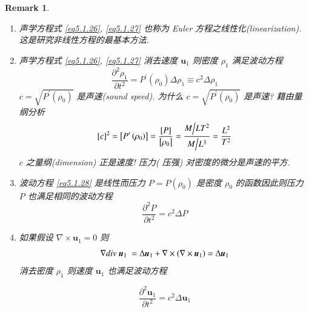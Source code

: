 \documentclass[11pt]{article}
\newtheorem{remark}{Remark}[subsection]
\begin{document}
\begin{remark}
	
	\text{}
	
	\vspace{-0.75cm}
	
	\begin{enumerate}
		\item 声学方程式 \ref{eq5.1.26}, \ref{eq5.1.27} 也称为 Euler 方程之线性化(linearization). 这是研究非线性方程的最基本方法.
		\item 声学方程式 \ref{eq5.1.26}, \ref{eq5.1.27} 消去速度 $ \boldsymbol{u}_{1} $ 则密度 $ \rho_1 $ 满足波动方程
		\begin{equation}
		\frac{{{\partial ^2}{\rho _1}}}{{\partial {t^2}}} = {P^{\prime}}\left( {{\rho _0}} \right)\Delta {\rho _1} \equiv {c^2}\Delta {\rho _1}
		\label{eq5.1.28}
		\end{equation}
		$c = \sqrt {{P^{\prime}}\left( {{\rho _0}} \right)} $ 是声速(sound speed). 为什么 $c = \sqrt {{P^{\prime}}\left( {{\rho _0}} \right)} $  是声速? 籍由量纲分析
		\begin{equation}
		{\left[ c \right]^2} = \left[ {{P^{\prime}}\left( {{\rho _0}} \right)} \right] = \frac{{\left[ P \right]}}{{\left[ {{\rho _0}} \right]}} = \frac{{{M \mathord{\left/
						{\vphantom {M {L{T^2}}}} \right.
						\kern-\nulldelimiterspace} {L{T^2}}}}}{{{M \mathord{\left/
						{\vphantom {M {{L^3}}}} \right.
						\kern-\nulldelimiterspace} {{L^3}}}}} = \frac{{{L^2}}}{{{T^2}}}
		\notag
		\end{equation}
		$ c $ 之量纲(dimension) 正是速度! 压力({\color{red} 压强}) 对密度的微分是声速的平方. 
		\item 波动方程 \ref{eq5.1.28} 是线性而压力 $P = P\left( {{\rho _0}} \right)$ 是密度 $ \rho_0 $ 的函数因此则压力 $ P $ 也满足相同的波动方程
		\begin{equation}
		\frac{{{\partial ^2}P}}{{\partial {t^2}}} = {c^2}\Delta P
		\label{eq5.1.29}
		\end{equation}
		\item 如果假设 $\nabla  \times {\boldsymbol{u}_1} = 0$ 则
		\begin{equation}
		\nabla div\;{\boldsymbol{u}_1}\; = \Delta {\boldsymbol{u}_1} + \nabla  \times \left( {\nabla  \times {\boldsymbol{u}_1}} \right) = \Delta {\boldsymbol{u}_1}
		\notag 
		\end{equation}
		消去密度 $ \rho_1 $ 则速度 $ \boldsymbol{u}_{1} $ 也满足波动方程
		
		\begin{equation}
		\frac{{{\partial ^2}{\boldsymbol{u}_1}}}{{\partial {t^2}}} = {c^2}\Delta {\boldsymbol{u}_1}
		\label{eq5.1.30}
		\end{equation}
		

\end{enumerate}
\end{remark}
\end{document}
